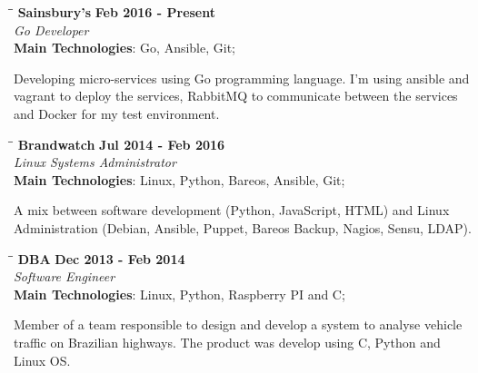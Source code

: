 \documentclass[margin]{res}
\begin{document}
\begin{resume}
\vspace{-0.1in}
   \begin{tabbing}
   \hspace{2.3in}\= \hspace{1.7in}\= \kill %
    \textbf{Sainsbury's}    \>\>\textbf{Feb 2016 - Present}\\
    \textit{Go Developer}\\        
    \textbf{Main Technologies}: Go, Ansible, Git;
   \end{tabbing}\vspace{-20pt}      %
    \vspace{2mm}
Developing micro-services using Go programming language. I'm using ansible and vagrant to deploy the services, RabbitMQ to communicate between the services and Docker for my test environment.

\vspace{-0.1in}
   \begin{tabbing}
   \hspace{2.3in}\= \hspace{1.7in}\= \kill %
    \textbf{Brandwatch}    \>\>\textbf{Jul 2014 - Feb 2016}\\
    \textit{Linux Systems Administrator}\\        
    \textbf{Main Technologies}: Linux, Python, Bareos, Ansible, Git;
   \end{tabbing}\vspace{-20pt}      %
    \vspace{2mm}
A mix between software development (Python, JavaScript, HTML) and Linux Administration (Debian, Ansible, Puppet, Bareos Backup, Nagios, Sensu, LDAP).

\vspace{-0.1in}
   \begin{tabbing}
   \hspace{2.3in}\= \hspace{1.7in}\= \kill %
    \textbf{DBA}    \>\>\textbf{Dec 2013 - Feb 2014}\\
    \textit{Software Engineer}\\        
    \textbf{Main Technologies}: Linux, Python, Raspberry PI and C;
   \end{tabbing}\vspace{-20pt}      %
    \vspace{2mm}
        Member of a team responsible to design and develop a system to analyse vehicle traffic on Brazilian highways. The product was develop using C, Python and Linux OS.


\end{resume}
\end{document}
